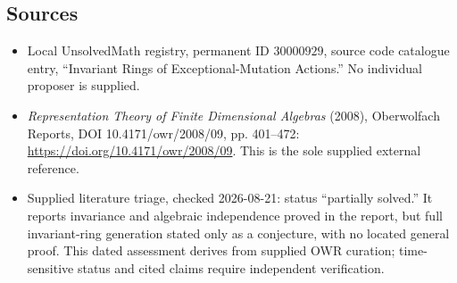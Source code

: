 \documentclass[11pt]{article}
\begin{document}
\subsection{Sources}
\begin{itemize}
\item Local UnsolvedMath registry, permanent ID \(30000929\), source code catalogue entry, ``Invariant Rings of Exceptional-Mutation Actions.'' No individual proposer is supplied.
\item \emph{Representation Theory of Finite Dimensional Algebras} (2008), Oberwolfach Reports, DOI 10.4171/owr/2008/09, pp. 401--472: \url{https://doi.org/10.4171/owr/2008/09}. This is the sole supplied external reference.
\item Supplied literature triage, checked 2026-08-21: status ``partially solved.'' It reports invariance and algebraic independence proved in the report, but full invariant-ring generation stated only as a conjecture, with no located general proof. This dated assessment derives from supplied OWR curation; time-sensitive status and cited claims require independent verification.
\end{itemize}
\end{document}
